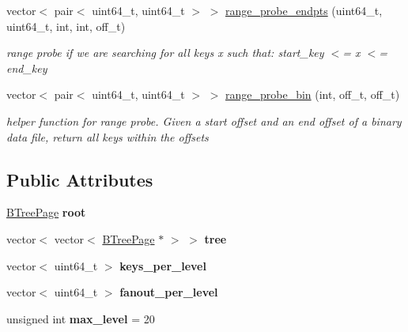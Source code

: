 \begin{DoxyCompactItemize}
vector$<$ pair$<$ uint64\+\_\+t, uint64\+\_\+t $>$ $>$ \hyperlink{class_b_tree_index_acf5cdb0e95eb8472762f945ccb7ade6d}{range\+\_\+probe\+\_\+endpts} (uint64\+\_\+t, uint64\+\_\+t, int, int, off\+\_\+t)
\begin{DoxyCompactList}\small\item\em range probe if we are searching for all keys x such that\+: start\+\_\+key $<$= x $<$= end\+\_\+key \end{DoxyCompactList}\item 
vector$<$ pair$<$ uint64\+\_\+t, uint64\+\_\+t $>$ $>$ \hyperlink{class_b_tree_index_a60cebd82ad0c571732099c1d67dd2c2a}{range\+\_\+probe\+\_\+bin} (int, off\+\_\+t, off\+\_\+t)
\begin{DoxyCompactList}\small\item\em helper function for range probe. Given a start offset and an end offset of a binary data file, return all keys within the offsets \end{DoxyCompactList}\end{DoxyCompactItemize}
\subsection*{Public Attributes}
\begin{DoxyCompactItemize}
\item 
\hypertarget{class_b_tree_index_a988b1687e253f7899d8d0a9e9843b006}{}\hyperlink{class_b_tree_page}{B\+Tree\+Page} {\bfseries root}\label{class_b_tree_index_a988b1687e253f7899d8d0a9e9843b006}

\item 
\hypertarget{class_b_tree_index_abd4ae24282d1758307060525cba080c7}{}vector$<$ vector$<$ \hyperlink{class_b_tree_page}{B\+Tree\+Page} $\ast$ $>$ $>$ {\bfseries tree}\label{class_b_tree_index_abd4ae24282d1758307060525cba080c7}

\item 
\hypertarget{class_b_tree_index_a7982147961269188e41438a5682b14f7}{}vector$<$ uint64\+\_\+t $>$ {\bfseries keys\+\_\+per\+\_\+level}\label{class_b_tree_index_a7982147961269188e41438a5682b14f7}

\item 
\hypertarget{class_b_tree_index_a87a1ab8990dd4e454d83e81acc3adbd4}{}vector$<$ uint64\+\_\+t $>$ {\bfseries fanout\+\_\+per\+\_\+level}\label{class_b_tree_index_a87a1ab8990dd4e454d83e81acc3adbd4}

\item 
\hypertarget{class_b_tree_index_ae9453917f1f749a4ba4b74e0821c670c}{}unsigned int {\bfseries max\+\_\+level} = 20\label{class_b_tree_index_ae9453917f1f749a4ba4b74e0821c670c}

\end{DoxyCompactItemize}



